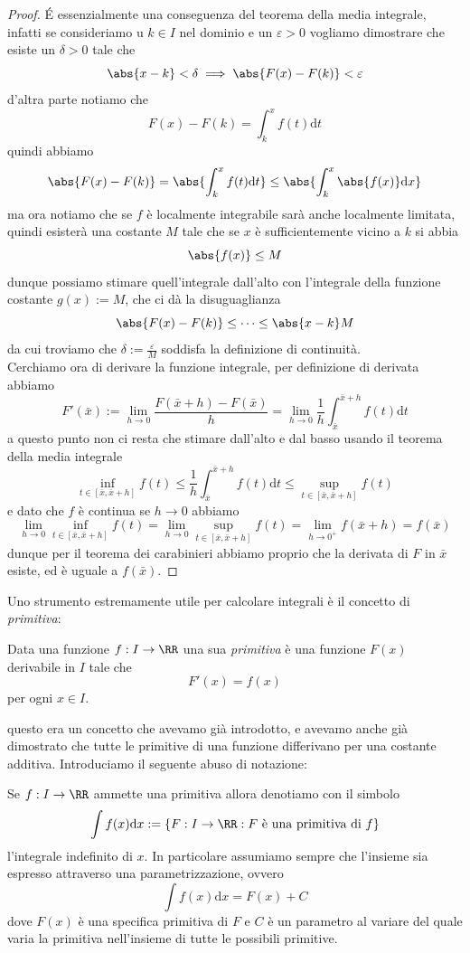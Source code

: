 \documentclass[11pt]{scrartcl}
\newcommand{\dif}{\text{d}}
\begin{document}
	\begin{proof}
		\'E essenzialmente una conseguenza del teorema della media integrale, infatti se consideriamo u $k\in I$ nel dominio e un $\varepsilon>0$ vogliamo dimostrare che esiste un $\delta>0$ tale che
		$$\abs{x-k}<\delta \implies \abs{F(x)-F(k)}<\varepsilon$$
		d'altra parte notiamo che 
		$$F(x)-F(k)=\int_k^x f(t)\dif t$$
		quindi abbiamo
		$$\abs{F(x)-F(k)}=\abs{\int_k^x f(t)\dif t}\le \abs{\int_k^x\abs{f(x)}\dif x}$$
		ma ora notiamo che se $f$ è localmente integrabile sarà anche localmente limitata, quindi esisterà una costante $M$ tale che se $x$ è sufficientemente vicino a $k$ si abbia
		$$\abs{f(x)}\le M$$
		dunque possiamo stimare quell'integrale dall'alto con l'integrale della funzione costante $g(x):=M$, che ci dà la disuguaglianza
		$$\abs{F(x)-F(k)}\le \dots \le \abs{x-k}M$$
		da cui troviamo che $\delta:=\frac{\varepsilon}{M}$ soddisfa la definizione di continuità. \\
		Cerchiamo ora di derivare la funzione integrale, per definizione di derivata abbiamo
		$$F'(\bar{x}):=\lim_{h\to 0}\frac{F(\bar{x}+h)-F(\bar{x})}{h}=\lim_{h\to 0}\frac{1}{h}\int_{\bar{x}}^{\bar{x}+h}f(t)\dif t$$
		a questo punto non ci resta che stimare dall'alto e dal basso usando il teorema della media integrale
		$$\inf_{t\in [\bar{x},\bar{x}+h]}f(t)\le\frac{1}{h}\int_{\bar{x}}^{\bar{x}+h}f(t)\dif t\le \sup_{t\in [\bar{x},\bar{x}+h]}f(t)$$
		e dato che $f$ è continua se $h\to 0$ abbiamo
		$$\lim_{h\to 0}\inf_{t\in [\bar{x},\bar{x}+h]}f(t)=\lim_{h\to 0}\sup_{t\in [\bar{x},\bar{x}+h]}f(t)=\lim_{h\to 0^+}f(\bar{x}+h)=f(\bar{x})$$
		dunque per il teorema dei carabinieri abbiamo proprio che la derivata di $F$ in $\bar{x}$ esiste, ed è uguale a $f(\bar{x})$.
	\end{proof}
	Uno strumento estremamente utile per calcolare integrali è il concetto di \textit{primitiva}:
	\begin{definition}[Primitiva]
		Data una funzione $f:I\to \RR$ una sua \textit{primitiva} è una funzione $F(x)$ derivabile in $I$ tale che
		$$F'(x)=f(x)$$
		per ogni $x\in I$.
	\end{definition}
	questo era un concetto che avevamo già introdotto, e avevamo anche già dimostrato che tutte le primitive di una funzione differivano per una costante additiva. Introduciamo il seguente abuso di notazione:
	\begin{definition}
		Se $f:I\to\RR$ ammette una primitiva allora denotiamo con il simbolo
		$$\int f(x)\dif x:=\left\{F:I\to\RR:\text{$F$ è una primitiva di $f$}\right\}$$
		l'integrale indefinito di $x$. In particolare assumiamo sempre che l'insieme sia espresso attraverso una parametrizzazione, ovvero
		$$\int f(x)\dif x=F(x)+C$$
		dove $F(x)$ è una specifica primitiva di $F$ e $C$ è un parametro al variare del quale varia la primitiva nell'insieme di tutte le possibili primitive.
	\end{definition}
\end{document}
